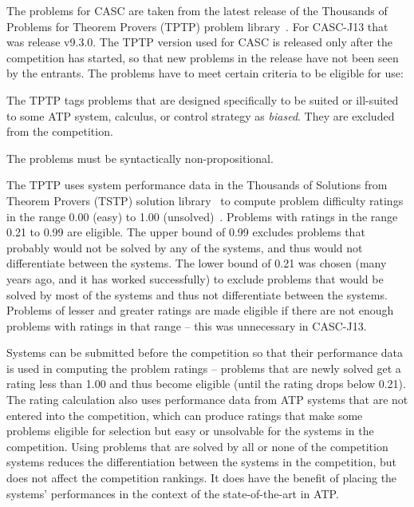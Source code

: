 \documentclass[aic]{iosart2x}
\newenvironment{packed_itemize}{
\vspace*{-0.3em}
\begin{itemize}
  \setlength{\partopsep}{0pt}
  \setlength{\itemsep}{1pt}
  \setlength{\parskip}{0pt}
  \setlength{\parsep}{0pt}
}{\end{itemize}}
\newcommand{\THIS}{\mbox{CASC-J13}}
\begin{document}
The problems for CASC
are taken from the latest release of the
Thousands of Problems for Theorem Provers (TPTP) problem library~\cite{Sut17}.
For \THIS{} that was release v9.3.0.
The TPTP version used for CASC is released only after the competition has started, so that new
problems in the release have not been seen by the entrants.
The problems have to meet certain criteria to be eligible for use:
\begin{packed_itemize}
\item The TPTP tags problems that are designed specifically to be suited or ill-suited to some ATP
      system, calculus, or control strategy as \textit{biased}.
      They are excluded from the competition.
\item The problems must be syntactically non-prop\-osi\-tional.
\item The TPTP uses system performance data in the Thousands of Solutions from Theorem Provers
      (TSTP) solution library~\cite{Sut07-CSR} to compute problem difficulty ratings in the 
      range 0.00 (easy) to 1.00 (unsolved)~\cite{SS01}.
      Problems with ratings in the range 0.21 to 0.99 are eligible.
      The upper bound of 0.99 excludes problems that probably would not be solved by any of the 
      systems, and thus would not differentiate between the systems.
      The lower bound of 0.21 was chosen (many years ago, and it has worked successfully) to
      exclude problems that would be solved by most of the systems and thus not differentiate
      between the systems.
      Problems of lesser and greater ratings are made eligible if there are not enough problems
      with ratings in that range -- this was unnecessary in \THIS{}.

      \hspace*{1em}
      Systems can be submitted before the competition so that their performance data is used in
      computing the problem ratings -- problems that are newly solved get a rating less than
      1.00 and thus become eligible (until the rating drops below 0.21).
      The rating calculation also uses performance data from ATP systems that are not
      entered into the competition, which can produce ratings that make some problems eligible
      for selection but easy or unsolvable for the systems in the competition.
      Using problems that are solved by all or none of the competition systems reduces the
      differentiation between the systems in the competition, but does not affect the competition 
      rankings.
      It does have the benefit of placing the systems' performances in the context of the 
      state-of-the-art in ATP.
\end{packed_itemize}
\end{document}
